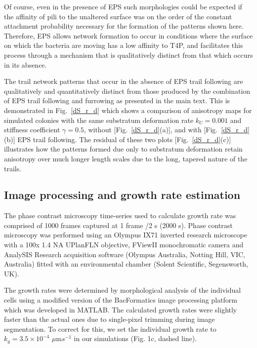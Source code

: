\documentclass[aps,prl,numerical,reprint,superscriptaddress,showpacs]{revtex4-1}
\begin{document}
Of course, even in the presence of EPS such morphologies could be expected if the affinity of pili to the unaltered surface was on the order of the constant attachment probability necessary for the formation of the patterns shown here. Therefore, EPS allows network formation to occur in conditions where the surface on which the bacteria are moving has a low affinity to T4P, and facilitates this process through a mechanism that is qualitatively distinct from that which occurs in its absence. 

The trail network patterns that occur in the absence of EPS trail following are qualitatively and quantitatively distinct from those produced by the combination of EPS trail following and furrowing as presented in the main text. This is demonstrated in Fig.~\ref{dS_r_d} which shows a comparison of anisotropy maps for simulated colonies with the same substratum deformation rate $k_U = 0.001$ and stiffness coefficient $\gamma = 0.5$, without [Fig.~\ref{dS_r_d}(a)], and with [Fig.~\ref{dS_r_d}(b)] EPS trail following. The residual of these two plots [Fig.~\ref{dS_r_d}(c)] illustrates how the patterns formed due only to substratum deformation retain anisotropy over much longer length scales due to the long, tapered nature of the trails. 


\subsection{Image processing and growth rate estimation}


The phase contrast microscopy time-series used to calculate growth rate was comprised of 1000 frames captured at 1 frame /2 s (2000 s). Phase contrast microscopy was performed using an Olympus IX71 inverted research microscope with a 100x 1.4 NA UPlanFLN objective, FViewII monochromatic camera and AnalySIS Research acquisition software (Olympus Australia, Notting Hill, VIC, Australia) fitted with an environmental chamber (Solent Scientific, Segensworth, UK). 


The growth rates were determined by morphological analysis of the individual cells using a modified version of the BacFormatics image processing platform \cite{turnbull2016explosive} which was developed in MATLAB. The calculated growth rates were slightly faster than the actual ones due to single-pixel trimming during image segmentation. To correct for this, we set the individual growth rate to $k_g = 3.5 \times 10 ^{-4}$ $ \mu$m$s^{-1}$ in our simulations (Fig. 1c, dashed line). 
\end{document}
